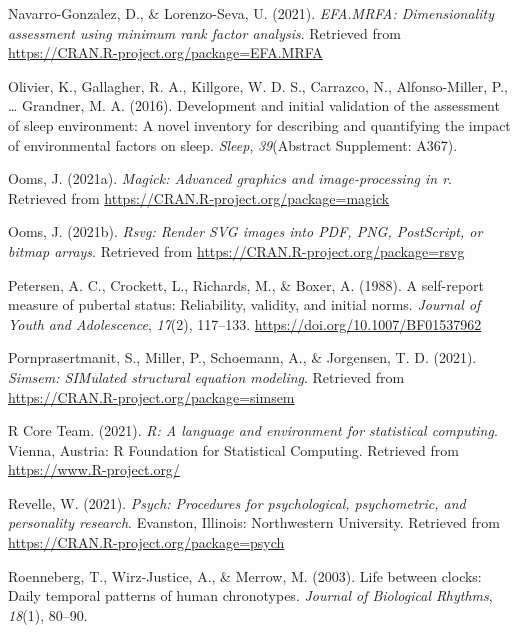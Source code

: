 \documentclass[
  english,
  man]{apa6}
\newlength{\cslhangindent}
\newlength{\cslentryspacingunit} %
\newenvironment{CSLReferences}[2] %
 {%
  \setlength{\parindent}{0pt}
  \ifodd #1
  \let\oldpar\par
  \def\par{\hangindent=\cslhangindent\oldpar}
  \fi
  \setlength{\parskip}{#2\cslentryspacingunit}
 }%
 {}
\begin{document}
\begin{CSLReferences}{1}{0}
\leavevmode{}%
Navarro-Gonzalez, D., \& Lorenzo-Seva, U. (2021). \emph{EFA.MRFA: Dimensionality assessment using minimum rank factor analysis}. Retrieved from \url{https://CRAN.R-project.org/package=EFA.MRFA}

\leavevmode{}%
Olivier, K., Gallagher, R. A., Killgore, W. D. S., Carrazco, N., Alfonso-Miller, P., \ldots{} Grandner, M. A. (2016). Development and initial validation of the assessment of sleep environment: A novel inventory for describing and quantifying the impact of environmental factors on sleep. \emph{Sleep}, \emph{39}(Abstract Supplement: A367).

\leavevmode{}%
Ooms, J. (2021a). \emph{Magick: Advanced graphics and image-processing in r}. Retrieved from \url{https://CRAN.R-project.org/package=magick}

\leavevmode{}%
Ooms, J. (2021b). \emph{Rsvg: Render SVG images into PDF, PNG, PostScript, or bitmap arrays}. Retrieved from \url{https://CRAN.R-project.org/package=rsvg}

\leavevmode{}%
Petersen, A. C., Crockett, L., Richards, M., \& Boxer, A. (1988). A self-report measure of pubertal status: Reliability, validity, and initial norms. \emph{Journal of Youth and Adolescence}, \emph{17}(2), 117--133. \url{https://doi.org/10.1007/BF01537962}

\leavevmode{}%
Pornprasertmanit, S., Miller, P., Schoemann, A., \& Jorgensen, T. D. (2021). \emph{Simsem: SIMulated structural equation modeling}. Retrieved from \url{https://CRAN.R-project.org/package=simsem}

\leavevmode{}%
R Core Team. (2021). \emph{R: A language and environment for statistical computing}. Vienna, Austria: R Foundation for Statistical Computing. Retrieved from \url{https://www.R-project.org/}

\leavevmode{}%
Revelle, W. (2021). \emph{Psych: Procedures for psychological, psychometric, and personality research}. Evanston, Illinois: Northwestern University. Retrieved from \url{https://CRAN.R-project.org/package=psych}

\leavevmode{}%
Roenneberg, T., Wirz-Justice, A., \& Merrow, M. (2003). Life between clocks: Daily temporal patterns of human chronotypes. \emph{Journal of Biological Rhythms}, \emph{18}(1), 80--90.


\end{CSLReferences}
\end{document}
